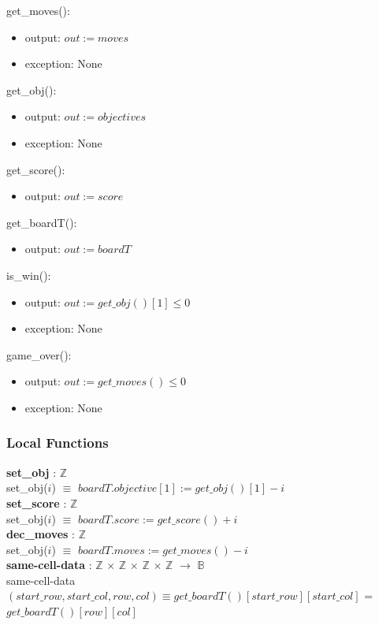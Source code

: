 \documentclass[12pt]{article}
\begin{document}
\noindent get\_moves():
\begin{itemize}
\item output: $out := moves$
\item exception: None
\end{itemize}

\noindent get\_obj():
\begin{itemize}
\item output: $out := objectives$
\item exception: None
\end{itemize}

\noindent get\_score():
\begin{itemize}
\item output: $out := score$
\end{itemize}

\noindent get\_boardT():
\begin{itemize}
\item output: $out := boardT$
\end{itemize}

\noindent is\_win():
\begin{itemize}
\item output: $out := get\_obj()[1] \le 0$
\item exception: None
\end{itemize}

\noindent game\_over():
\begin{itemize}
\item output: $out := get\_moves() \le 0$
\item exception: None
\end{itemize}

\subsubsection* {Local Functions}
\textbf{set\_obj} : $\mathbb{Z}$ \\
set\_obj($i$) $\equiv$ $boardT.objective[1] := get\_obj()[1] - i$\\

\textbf{set\_score} : $\mathbb{Z}$ \\
set\_obj($i$) $\equiv$ $boardT.score := get\_score() + i$\\

\textbf{dec\_moves} : $\mathbb{Z}$ \\
set\_obj($i$) $\equiv$ $boardT.moves := get\_moves() - i$\\

\textbf{same-cell-data} : $\mathbb{Z}$ $\times$  $\mathbb{Z}$ $\times$ $\mathbb{Z}$ $\times$ $\mathbb{Z}$ $\rightarrow$ $\mathbb{B}$\\
same-cell-data$(start\_row, start\_col, row, col) \equiv get\_boardT()[start\_row][start\_col]$ 
= $get\_boardT()[row][col]$\\
\end{document}

